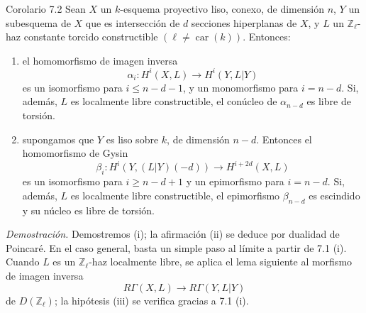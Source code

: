 \begin{statement}{Corolario 7.2}
Sean $X$ un $k$-esquema proyectivo liso, conexo, de dimensión $n$, $Y$ un subesquema de $X$ que es intersección de $d$ secciones hiperplanas de $X$, y $L$ un $\mathbb Z_\ell$-haz constante torcido constructible $(\ell\ne\operatorname{car}(k))$. Entonces:
\begin{enumerate}[label=(\roman*)]
\item el homomorfismo de imagen inversa
\[
\alpha_i:H^i(X,L)\to H^i(Y,L|Y)
\]
es un isomorfismo para $i\le n-d-1$, y un monomorfismo para $i=n-d$. Si, además, $L$ es localmente libre constructible, el conúcleo de $\alpha_{n-d}$ es libre de torsión.
\item supongamos que $Y$ es liso sobre $k$, de dimensión $n-d$. Entonces el homomorfismo de Gysin
\[
\beta_i:H^i(Y,(L|Y)(-d))\to H^{i+2d}(X,L)
\]
es un isomorfismo para $i\ge n-d+1$ y un epimorfismo para $i=n-d$. Si, además, $L$ es localmente libre constructible, el epimorfismo $\beta_{n-d}$ es escindido y su núcleo es libre de torsión.
\end{enumerate}
\end{statement}

\emph{Demostración.} Demostremos (i); la afirmación (ii) se deduce por dualidad de Poincaré. En el caso general, basta un simple paso al límite a partir de 7.1 (i). Cuando $L$ es un $\mathbb Z_\ell$-haz localmente libre, se aplica el lema siguiente al morfismo de imagen inversa
\[
R\Gamma(X,L)\to R\Gamma(Y,L|Y)
\]
de $D(\mathbb Z_\ell)$; la hipótesis (iii) se verifica gracias a 7.1 (i).

